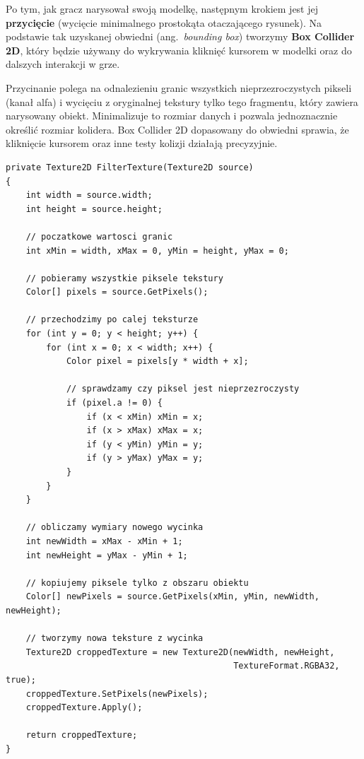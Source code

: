 \documentclass[a4paper,12pt]{book} %
\begin{document}
Po tym, jak gracz narysował swoją modelkę, następnym krokiem jest jej \textbf{przycięcie} (wycięcie minimalnego prostokąta otaczającego rysunek). Na podstawie tak uzyskanej obwiedni (ang.\ \emph{bounding box}) tworzymy \textbf{Box Collider 2D}, który będzie używany do wykrywania kliknięć kursorem w modelki oraz do dalszych interakcji w grze.

Przycinanie polega na odnalezieniu granic wszystkich nieprzezroczystych pikseli (kanał alfa) i wycięciu z oryginalnej tekstury tylko tego fragmentu, który zawiera narysowany obiekt. Minimalizuje to rozmiar danych i pozwala jednoznacznie określić rozmiar kolidera. Box Collider 2D dopasowany do obwiedni sprawia, że kliknięcie kursorem oraz inne testy kolizji działają precyzyjnie.

\begin{lstlisting}[language=CSharp, caption={Przycinanie tekstury do obszaru narysowanego obiektu}, label={lst:filtertexture}]
private Texture2D FilterTexture(Texture2D source) 
{
    int width = source.width;
    int height = source.height;

    // poczatkowe wartosci granic
    int xMin = width, xMax = 0, yMin = height, yMax = 0;

    // pobieramy wszystkie piksele tekstury
    Color[] pixels = source.GetPixels();

    // przechodzimy po calej teksturze
    for (int y = 0; y < height; y++) {
        for (int x = 0; x < width; x++) {
            Color pixel = pixels[y * width + x];

            // sprawdzamy czy piksel jest nieprzezroczysty
            if (pixel.a != 0) {
                if (x < xMin) xMin = x;
                if (x > xMax) xMax = x;
                if (y < yMin) yMin = y;
                if (y > yMax) yMax = y;
            }
        }
    }

    // obliczamy wymiary nowego wycinka
    int newWidth = xMax - xMin + 1;
    int newHeight = yMax - yMin + 1;

    // kopiujemy piksele tylko z obszaru obiektu
    Color[] newPixels = source.GetPixels(xMin, yMin, newWidth, newHeight);

    // tworzymy nowa teksture z wycinka
    Texture2D croppedTexture = new Texture2D(newWidth, newHeight, 
                                             TextureFormat.RGBA32, true);
    croppedTexture.SetPixels(newPixels);
    croppedTexture.Apply();

    return croppedTexture;
}
\end{lstlisting}
\end{document}
